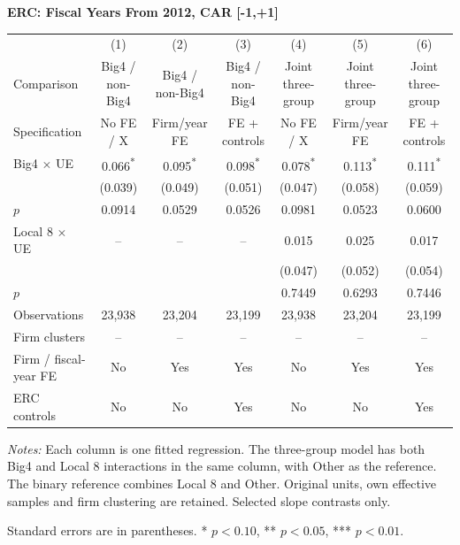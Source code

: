 \documentclass[10pt]{article}
\newcommand{\sym}[1]{\textsuperscript{#1}}
\begin{document}
\begin{minipage}{23.60cm}
\fontsize{10}{12}\selectfont
\setlength{\tabcolsep}{4pt}\renewcommand{\arraystretch}{1.08}
{\large\bfseries ERC: Fiscal Years From 2012, CAR [-1,+1]}\par\medskip
\begin{tabular*}{\linewidth}{@{\extracolsep{\fill}}lcccccc@{}}
\toprule
 & (1) & (2) & (3) & (4) & (5) & (6) \\
Comparison & Big4 / non-Big4 & Big4 / non-Big4 & Big4 / non-Big4 & Joint three-group & Joint three-group & Joint three-group \\
Specification & No FE / X & Firm/year FE & FE + controls & No FE / X & Firm/year FE & FE + controls \\
\midrule
Big4 $\times$ UE & 0.066\sym{*} & 0.095\sym{*} & 0.098\sym{*} & 0.078\sym{*} & 0.113\sym{*} & 0.111\sym{*} \\
 & (0.039) & (0.049) & (0.051) & (0.047) & (0.058) & (0.059) \\
$p$ & 0.0914 & 0.0529 & 0.0526 & 0.0981 & 0.0523 & 0.0600 \\
Local 8 $\times$ UE & -- & -- & -- & 0.015 & 0.025 & 0.017 \\
 &  &  &  & (0.047) & (0.052) & (0.054) \\
$p$ &  &  &  & 0.7449 & 0.6293 & 0.7446 \\
\midrule
Observations & 23,938 & 23,204 & 23,199 & 23,938 & 23,204 & 23,199 \\
Firm clusters & -- & -- & -- & -- & -- & -- \\
Firm / fiscal-year FE & No & Yes & Yes & No & Yes & Yes \\
ERC controls & No & No & Yes & No & No & Yes \\
\bottomrule\end{tabular*}\par\medskip
\fontsize{9}{11}\selectfont\textit{Notes:} Each column is one fitted regression. The three-group model has both Big4 and Local 8 interactions in the same column, with Other as the reference. The binary reference combines Local 8 and Other. Original units, own effective samples and firm clustering are retained. Selected slope contrasts only.
\par Standard errors are in parentheses. * $p<0.10$, ** $p<0.05$, *** $p<0.01$.
\end{minipage}
\end{document}
